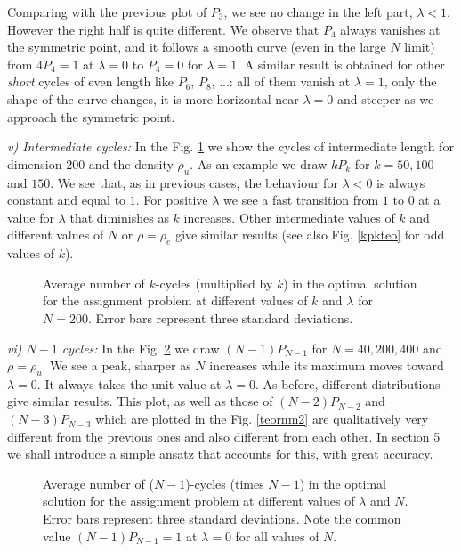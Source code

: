 \documentclass[]{iopart}
\begin{document}
Comparing with the previous plot of $P_3$, we see no change in the left part,
$\lambda < 1$. However the right half is quite different.
We observe that $P_4$ always vanishes at the symmetric point, 
and it follows a smooth curve (even in the large $N$ limit)
from $4P_4=1$ at $\lambda=0$ to $P_4=0$ for $\lambda=1$. 
A similar result is obtained for other {\it short} cycles of even length
like $P_6$, $P_8$, ...:
all of them vanish at $\lambda=1$, only the shape of the curve
changes, it is more horizontal near $\lambda=0$ 
and steeper as we approach the symmetric point.

{\it v) Intermediate cycles:}
In the Fig. \ref{pk} we show the cycles of intermediate length for dimension $200$
and the density $\rho_u$.
As an example we draw $kP_k$ for $k=50,100$ and $ 150$.
We see that, as in previous cases, the behaviour for $\lambda<0$ is 
always constant and equal to $1$. For positive $\lambda$ we see
a fast transition from $1$ to $0$ at a value for $\lambda$ that diminishes
as $k$ increases. Other intermediate values of $k$ and different values of $N$ or $\rho = \rho_e$ 
give similar results (see also Fig. \ref{kpkteo} for odd values of $k$).
\begin{figure}[h!]
\caption{\small Average number of $k$-cycles (multiplied by $k$)
in the optimal solution for the assignment problem at different 
values of $k$ and $\lambda$ for $N=200$. 
Error bars represent three standard deviations. }
\label{pk}
\end{figure}


{\it vi) $N-1$ cycles:}
In the Fig. \ref{pnm1} we draw $(N-1)P_{N-1}$ for $N=40, 200, 400$
and $\rho=\rho_u$. We see a peak, sharper as $N$ increases while
its maximum moves toward $\lambda=0$. It always takes
the unit value at $\lambda=0$.
As before, different distributions give similar results.
This plot, as well as those of $(N-2) P_{N-2}$ and $(N-3)P_{N-3}$
which are plotted in the Fig. \ref{teornm2} 
are qualitatively very different from the previous ones
and also different from each other.
In section 5 we shall introduce a simple ansatz that accounts for this,
with great accuracy.
\begin{figure}[h!]
\caption{\small Average number of ($N-1$)-cycles (times $N-1$) 
in the optimal solution for
  the assignment problem at different values of $\lambda$ and  $N$.  Error bars represent three standard deviations. Note the common value $(N-1)P_{N-1}=1$ 
 at $\lambda =0$ for all values of $N$.}
\label{pnm1}
\end{figure}
\end{document}
